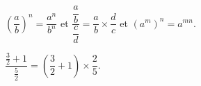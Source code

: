 $\left(\dfrac a b\right)^n = \dfrac{a^n}{b^n}$ \quad et \quad
$\dfrac{\dfrac a b}{\dfrac c d} = \dfrac a b \times \dfrac d c$
\quad et \quad $\left(a^m\right)^n = a^{mn}$.\medskip

$\dfrac{\frac 32 + 1}{\frac 5 2} = \left(\dfrac 32 + 1\right) \times \dfrac 25$.